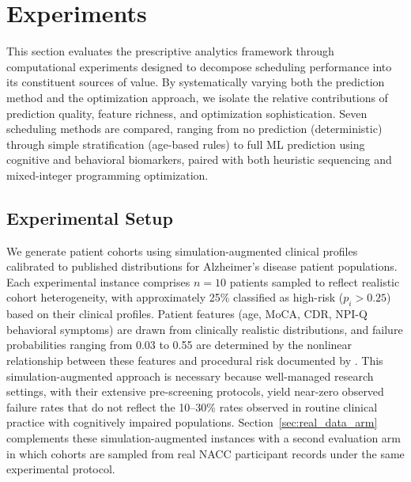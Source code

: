 \documentclass[11pt,a4paper]{article}
\newcommand{\rev}[1]{{\color{red}#1}}
\begin{document}


\section{Experiments}
\label{sec:experiments}

This section evaluates the prescriptive analytics framework through computational experiments designed to decompose scheduling performance into its constituent sources of value. By systematically varying both the prediction method and the optimization approach, we isolate the relative contributions of prediction quality, feature richness, and optimization sophistication. Seven scheduling methods are compared, ranging from no prediction (deterministic) through simple stratification (age-based rules) to full ML prediction using cognitive and behavioral biomarkers, paired with both heuristic sequencing and mixed-integer programming optimization.

\subsection{Experimental Setup}
\label{sec:experimental_setup}

We generate patient cohorts using simulation-augmented clinical profiles calibrated to published distributions for Alzheimer's disease patient populations. Each experimental instance comprises $n = 10$ patients sampled to reflect realistic cohort heterogeneity, with approximately 25\% classified as high-risk ($p_i > 0.25$) based on their clinical profiles. Patient features (age, MoCA, CDR, NPI-Q behavioral symptoms) are drawn from clinically realistic distributions, and failure probabilities ranging from 0.03 to 0.55 are determined by the nonlinear relationship between these features and procedural risk documented by \citet{porembka2025disparities}. This simulation-augmented approach is necessary because well-managed research settings, with their extensive pre-screening protocols, yield near-zero observed failure rates that do not reflect the 10--30\% rates observed in routine clinical practice with cognitively impaired populations. \rev{Section~\ref{sec:real_data_arm} complements these simulation-augmented instances with a second evaluation arm in which cohorts are sampled from real NACC participant records under the same experimental protocol.}
\end{document}
